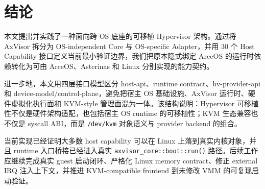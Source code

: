 \documentclass[a4paper,11pt]{article}
\begin{document}
\section{结论}

本文提出并实践了一种面向跨 OS 底座的可移植 Hypervisor 架构。通过将 AxVisor 拆分为 OS-independent Core 与 OS-specific Adapter，并用 30 个 Host Capability 接口定义当前最小验证边界，我们把原本隐式绑定 ArceOS 的运行时依赖转化为可由 ArceOS、Asterinas 和 Linux 分别实现的能力契约。

进一步地，本文用四层接口模型区分 host-api、runtime contract、hv-provider-api 和 device-model/control-plane，避免把宿主 OS 基础设施、AxVisor 运行时、硬件虚拟化执行面和 KVM-style 管理面混为一体。该结构说明：Hypervisor 可移植性不仅是硬件架构适配，也包括宿主 OS runtime 的可移植性；KVM 生态兼容也不仅是 syscall ABI，而是 \texttt{/dev/kvm} 对象语义与 provider backend 的组合。

当前实现已经证明大多数 host capability 可以在 Linux 上落到真实内核对象，并且 runtime 入口桥接已经进入真实 \texttt{axvisor\_core::boot::run()} 路径。后续工作应继续完成真实 guest 启动闭环、严格化 Linux memory contract、修正 external IRQ 注入上下文，并推进 KVM-compatible frontend 到未修改 VMM 的可复现启动验证。



\end{document}
